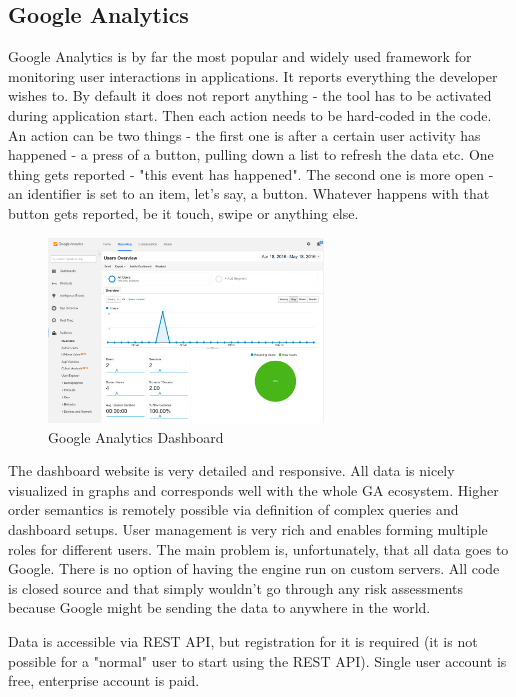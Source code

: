 \subsection{Google Analytics}

Google Analytics is by far the most popular and widely used framework for monitoring user interactions in applications. It reports everything the developer wishes to. By default it does not report anything - the tool has to be activated during application start. Then each action needs to be hard-coded in the code. An action can be two things - the first one is after a certain user activity has happened - a press of a button, pulling down a list to refresh the data etc. One thing gets reported - "this event has happened". The second one is more open - an identifier is set to an item, let's say, a button. Whatever happens with that button gets reported, be it touch, swipe or anything else.

\begin{figure}[!ht]
	\centering
	\includegraphics[width=0.65\textwidth]{figures/02_analysis/analytics}
    \caption{Google Analytics Dashboard}
\end{figure}

The dashboard website is very detailed and responsive. All data is nicely visualized in graphs and corresponds well with the whole GA ecosystem. Higher order semantics is remotely possible via definition of complex queries and dashboard setups. User management is very rich and enables forming multiple roles for different users. The main problem is, unfortunately, that all data goes to Google. There is no option of having the engine run on custom servers. All code is closed source and that simply wouldn't go through any risk assessments because Google might be sending the data to anywhere in the world.

Data is accessible via REST API, but registration for it is required (it is not possible for a "normal" user to start using the REST API). Single user account is free, enterprise account is paid.

